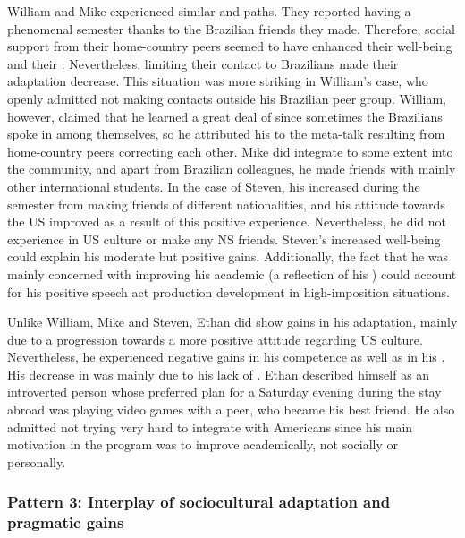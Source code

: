 \documentclass[output=paper]{langsci/langscibook}
\begin{document}
\newpage 
William and Mike experienced similar  and  paths. They reported having a phenomenal semester thanks to the Brazilian friends they made. Therefore, social support from their home-country peers seemed to have enhanced their well-being and their . Nevertheless, limiting their contact to Brazilians made their  adaptation decrease. This situation was more striking in William’s case, who openly admitted not making contacts outside his Brazilian peer group. William, however, claimed that he learned a great deal of  since sometimes the Brazilians spoke in  among themselves, so he attributed his  to the meta-talk resulting from home-country peers correcting each other. Mike did integrate to some extent into the  community, and apart from Brazilian colleagues, he made friends with mainly other international students. In the case of Steven, his  increased during the semester from making friends of different nationalities, and his attitude towards the US improved as a result of this positive experience. Nevertheless, he did not experience  in US culture or make any NS friends. Steven’s increased well-being could explain his moderate but positive  gains. Additionally, the fact that he was mainly concerned with improving his academic  (a reflection of his ) could account for his positive speech act production development in high-imposition situations. 

  
Unlike William, Mike and Steven, Ethan did show gains in his  adaptation, mainly due to a progression towards a more positive attitude regarding US culture. Nevertheless, he experienced negative gains in his  competence as well as in his . His decrease in  was mainly due to his lack of . Ethan described himself as an introverted person whose preferred plan for a Saturday evening during the stay abroad was playing video games with a  peer, who became his best friend. He also admitted not trying very hard to integrate with Americans since his main motivation in the program was to improve academically, not socially or personally.


\subsubsection{Pattern 3: Interplay of sociocultural adaptation and pragmatic gains}
\end{document}
